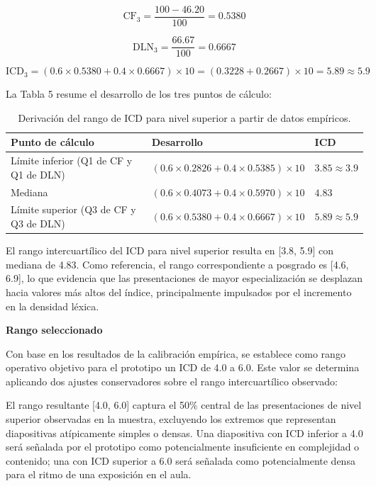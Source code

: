 \documentclass[11pt]{article}
\newcommand{\ttstyle}{%
  \small
  \setlength{\tabcolsep}{6pt}%
  \renewcommand{\arraystretch}{1.25}%
  \arrayrulecolor{azulprofundo}%
}
\newcommand{\hairrule}{%
  \arrayrulecolor{azulregla}\midrule[0.3pt]\arrayrulecolor{azulprofundo}%
}
\begin{document}
\[
\mathrm{CF}_3 = \frac{100 - 46.20}{100} = 0.5380
\]

\[
\mathrm{DLN}_3 = \frac{66.67}{100} = 0.6667
\]

\[
\mathrm{ICD}_3 = (0.6 \times 0.5380 + 0.4 \times 0.6667) \times 10 = (0.3228 + 0.2667) \times 10 = 5.89 \approx 5.9
\]

La Tabla 5 resume el desarrollo de los tres puntos de cálculo:

\begin{table}[H]
    \centering
    \scriptsize
    \ttstyle
    \begin{tabular}{p{3.1cm}p{7.6cm}p{2.3cm}}
        \toprule
        \textbf{Punto de cálculo} & \textbf{Desarrollo} & \textbf{ICD} \\
        \midrule
        Límite inferior (Q1 de CF y Q1 de DLN) & $(0.6 \times 0.2826 + 0.4 \times 0.5385) \times 10$ & $3.85 \approx 3.9$ \\
        \hairrule
        Mediana & $(0.6 \times 0.4073 + 0.4 \times 0.5970) \times 10$ & $4.83$ \\
        \hairrule
        Límite superior (Q3 de CF y Q3 de DLN) & $(0.6 \times 0.5380 + 0.4 \times 0.6667) \times 10$ & $5.89 \approx 5.9$ \\
        \bottomrule
    \end{tabular}
    \caption{Derivación del rango de ICD para nivel superior a partir de datos empíricos.}
\end{table}
El rango intercuartílico del ICD para nivel superior resulta en [3.8, 5.9] con mediana de 4.83. Como referencia, el rango correspondiente a posgrado es [4.6, 6.9], lo que evidencia que las presentaciones de mayor especialización se desplazan hacia valores más altos del índice, principalmente impulsados por el incremento en la densidad léxica.

\textbf{Rango seleccionado}

Con base en los resultados de la calibración empírica, se establece como rango operativo objetivo para el prototipo un ICD de 4.0 a 6.0. Este valor se determina aplicando dos ajustes conservadores sobre el rango intercuartílico observado:

El rango resultante [4.0, 6.0] captura el 50\% central de las presentaciones de nivel superior observadas en la muestra, excluyendo los extremos que representan diapositivas atípicamente simples o densas. Una diapositiva con ICD inferior a 4.0 será señalada por el prototipo como potencialmente insuficiente en complejidad o contenido; una con ICD superior a 6.0 será señalada como potencialmente densa para el ritmo de una exposición en el aula.
\end{document}

